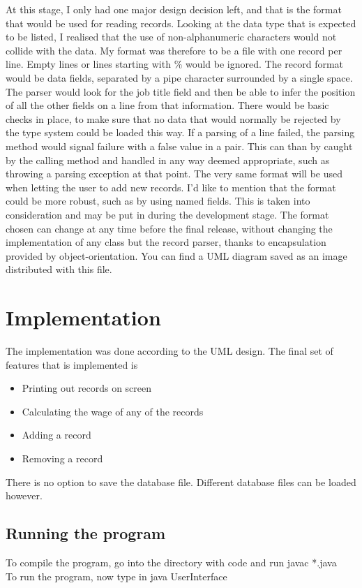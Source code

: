 \documentclass{report}
\begin{document}
At this stage, I only had one major design decision left, and that is the format that would be used for reading records. Looking at the data type that is expected to be listed, I realised that the use of non-alphanumeric characters would not collide with the data. My format was therefore to be a file with one record per line. Empty lines or lines starting with \% would be ignored. The record format would be data fields, separated by a pipe character surrounded by a single space. The parser would look for the job title field and then be able to infer the position of all the other fields on a line from that information. There would be basic checks in place, to make sure that no data that would normally be rejected by the type system could be loaded this way. If a parsing of a line failed, the parsing method would signal failure with a false value in a pair. This can than by caught by the calling method and handled in any way deemed appropriate, such as throwing a parsing exception at that point. The very same format will be used when letting the user to add new records. I'd like to mention that the format could be more robust, such as by using named fields. This is taken into consideration and may be put in during the development stage. The format chosen can change at any time before the final release, without changing the implementation of any class but the record parser, thanks to encapsulation provided by object-orientation. You can find a UML diagram saved as an image distributed with this file.

\section*{Implementation}
The implementation was done according to the UML design. The final set of features that is implemented is
\begin{itemize}
  \item{Printing out records on screen}
  \item{Calculating the wage of any of the records}
  \item{Adding a record}
  \item{Removing a record}
\end{itemize}

There is no option to save the database file. Different database files can be loaded however.

\subsection*{Running the program}
To compile the program, go into the directory with code and run javac *.java\\
To run the program, now type in java UserInterface\\
\end{document}
